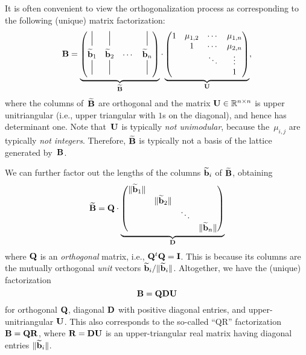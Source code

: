 \documentclass[11pt]{article}
\begin{document}
It is often convenient to view the orthogonalization process as
corresponding to the following (unique) matrix factorization:
% 
\newcommand{\vstrut}{\rule{.5pt}{4ex}}
\begin{equation}
  \label{eq:B-BtildeU}
  \matB =
  \underbrace{
    \begin{pmatrix}
      \vstrut & \vstrut & & \vstrut \\
      \gs{\vecb}_{1} & \gs{\vecb}_{2} & \cdots & \gs{\vecb}_{n} \\
      \vstrut & \vstrut & & \vstrut
    \end{pmatrix}
  }_{\gs{\matB}}
  \cdot
  \underbrace{
    \begin{pmatrix}
      1 & \mu_{1,2} & \cdots & \mu_{1,n} \\
        & 1 & \cdots & \mu_{2,n} \\
        & & \ddots & \vdots \\
        & & & 1
    \end{pmatrix}
  }_{\matU},
\end{equation}
where the columns of~$\widetilde{\mathbf{B}}$ are orthogonal and the matrix
$\mathbf{U} \in \mathbb{R}^{n \times n}$ is upper unitriangular (i.e., upper
triangular with $1$s on the diagonal), and hence has determinant one.
Note that~$\mathbf{U}$ is typically \emph{not unimodular}, because
the~$\mu_{i,j}$ are typically \emph{not integers}. Therefore,
$\widetilde{\mathbf{B}}$ is typically not a basis of the lattice generated
by~$\mathbf{B}$.

We can further factor out the lengths of the columns $\widetilde{\mathbf{b}}_{i}$
of $\widetilde{\mathbf{B}}$, obtaining
\begin{equation}
  \label{eq:Btilde-QD}
  \widetilde{\mathbf{B}} = \mathbf{Q} \cdot
  \underbrace{
    \begin{pmatrix}
      \lVert\widetilde{\mathbf{b}}_{1}\rVert & & & \\
                              & \lVert\widetilde{\mathbf{b}}_{2}\rVert & & \\
                              & & \ddots & \\
                              & & & \lVert\widetilde{\mathbf{b}}_{n}\rVert
    \end{pmatrix}
  }_{\mathbf{D}}
\end{equation}
where $\mathbf{Q}$ is an \emph{orthogonal} matrix, i.e.,
$\mathbf{Q}^{t} \mathbf{Q} = \mathbf{I}$. This is because its columns are the
mutually orthogonal \emph{unit} vectors
$\widetilde{\mathbf{b}}_{i}/\lVert\widetilde{\mathbf{b}}_{i}\rVert$. Altogether, we have the
(unique) factorization
\begin{equation}
  \label{eq:QDU}
  \mathbf{B} = \mathbf{Q} \mathbf{D} \mathbf{U}
\end{equation}
for orthogonal $\mathbf{Q}$, diagonal $\mathbf{D}$ with positive diagonal
entries, and upper-unitriangular $\mathbf{U}$. This also corresponds to the
so-called ``QR'' factorization $\mathbf{B} = \mathbf{Q} \mathbf{R}$, where
$\mathbf{R} = \mathbf{D} \mathbf{U}$ is an upper-triangular real matrix having
diagonal entries $\lVert\widetilde{\mathbf{b}}_{i}\rVert$.
\end{document}
